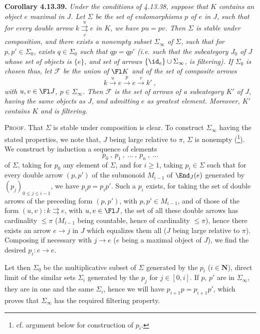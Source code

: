 
\noindent\textbf{Corollary 4.13.39.} {\itshape Under the conditions of 4.13.38, suppose that $K$ contains an object $e$ maximal in $J$. Let $\Sigma$ be the set of endomorphisms $p$ of $e$ in $J$, such that for every double arrow $k \overset{u}{\underset{v}{\rightrightarrows}} e$ \textup{in} $K$, we have $pu=pv$. Then $\Sigma$ is stable under composition, and there exists a nonempty subset $\Sigma_\infty$ of $\Sigma$, such that for $p,p'\in\Sigma_0$, exists
$q\in\Sigma_0$ such that $qp=qp'$ (i.e. such that the subcategory $J_0$ of $J$ whose set of objects is $\{e\}$, and set of arrows $\{\id_e\}\cup\Sigma_\infty$, is filtering). If $\Sigma_0$ is chosen thus, let $\mathcal{F}$ be the union of $\Fl K$ and of the set of composite arrows
\[
k \xrightarrow{\ u\ } e \xrightarrow{\ p\ } e \xrightarrow{\ v\ } k'\ , \tag*{$(*)$}
\]
with $u,v\in\Fl J$, $p\in\Sigma_\infty$. Then $\mathcal{F}$ is the set of arrows of a subcategory $K'$ of $J$, having the same objects as $J$, and admitting $e$ as greatest element. Moreover, $K'$ contains $K$ and is filtering.}

\noindent\textsc{Proof}. That $\Sigma$ is stable under composition is clear. To construct $\Sigma_\infty$ having the stated properties, we note that, $J$ being large relative to $\pi$, $\Sigma$ is nonempty (\footnote[162]{cf. argument below for construction of $p_i$.}). We construct by induction a sequence of elements
\[
p_0\ ,\ p_1\ ,\ \ldots\ ,\ p_n\ ,\ \ldots
\]
of $\Sigma$, taking for $p_0$ any element of $\Sigma$, and for $i\geqslant 1$, taking $p_i\in\Sigma$ such that for every double arrow $(p,p')$ of the submonoid $M_{i-1}$ of $\End_J(e)$ generated by $(p_j)_{0\leqslant j\leqslant i-1}$, we have $p_ip=p_ip'$. Such a $p_i$ exists, for taking the set of double arrows of the preceding form $(p,p')$, with $p,p'\in M_{i-1}$, and of those of the form $(u,v) : k \rightrightarrows e$, with $u,v\in\Fl J$, the set of
all these double arrows has cardinality $\leqslant\pi$ ($M_{i-1}$ being countable, hence of cardinality $\leqslant\pi$), hence there exists an arrow $e\longrightarrow j$ in $J$ which equalizes them all ($J$ being large relative to $\pi$). Composing if necessary with $j\longrightarrow e$ ($e$ being a maximal object of $J$), we find the desired $p_i : e\longrightarrow e$.

Let then $\Sigma_0$ be the multiplicative subset of $\Sigma$ generated by the $p_i$ ($i\in\mathbf{N}$), direct limit of the similar sets $\Sigma_i$ generated by the $p_j$ for $j\in[0,i]$. If $p$, $p'$ are in $\Sigma_\infty$, they are in one and the same $\Sigma_i$, hence we will have $p_{i+1}p=p_{i+1}p'$, which proves that $\Sigma_\infty$ has the required filtering property. %

